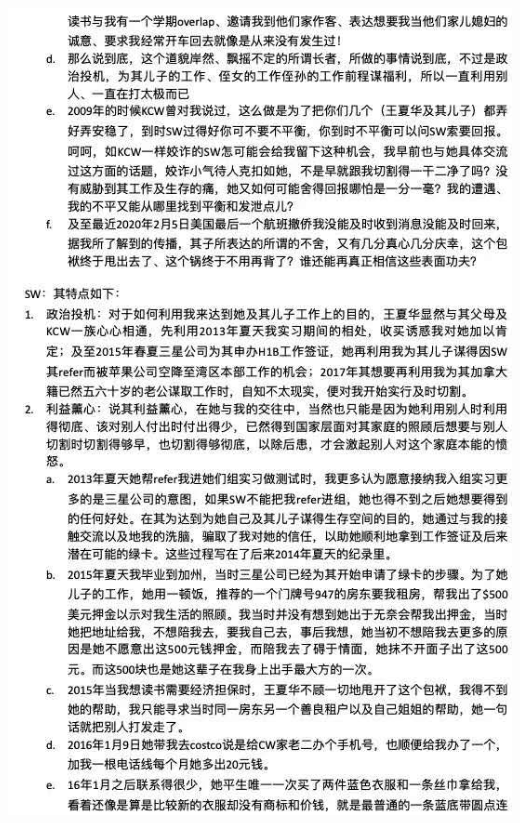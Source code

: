 \documentclass[9pt, b5paper]{article}
\begin{document}
\begin{center}
\includegraphics[width=.9\linewidth]{./pic/2.jpg}
\end{center}
\end{document}
